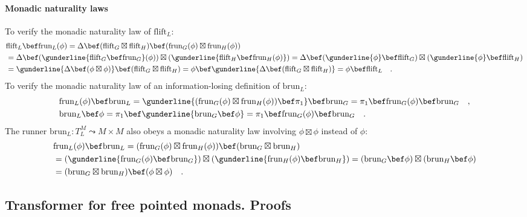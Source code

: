 \paragraph{Monadic naturality laws}

To verify the monadic naturality law of $\text{flift}_{L}$:
\begin{align*}
 & \text{flift}_{L}\bef\text{frun}_{L}(\phi)=\Delta\bef(\text{flift}_{G}\boxtimes\text{flift}_{H})\bef(\text{frun}_{G}(\phi)\boxtimes\text{frun}_{H}(\phi))\\
 & =\Delta\bef(\gunderline{\text{flift}_{G}\bef\text{frun}_{G}}(\phi))\boxtimes(\gunderline{\text{flift}_{H}\bef\text{frun}_{H}(\phi)})=\Delta\bef(\gunderline{\phi}\bef\text{flift}_{G})\boxtimes(\gunderline{\phi}\bef\text{flift}_{H})\\
 & =\gunderline{\Delta\bef(\phi\boxtimes\phi)}\bef(\text{flift}_{G}\boxtimes\text{flift}_{H})=\phi\bef\gunderline{\Delta\bef(\text{flift}_{G}\boxtimes\text{flift}_{H})}=\phi\bef\text{flift}_{L}\quad.
\end{align*}
To verify the monadic naturality law of an information-losing definition
of $\text{brun}_{L}$:
\begin{align*}
 & \text{frun}_{L}(\phi)\bef\text{brun}_{L}=\gunderline{(\text{frun}_{G}(\phi)\boxtimes\text{frun}_{H}(\phi))\bef\pi_{1}}\bef\text{brun}_{G}=\pi_{1}\bef\text{frun}_{G}(\phi)\bef\text{brun}_{G}\quad,\\
 & \text{brun}_{L}\bef\phi=\pi_{1}\bef\gunderline{\text{brun}_{G}\bef\phi}=\pi_{1}\bef\text{frun}_{G}(\phi)\bef\text{brun}_{G}\quad.
\end{align*}
The runner $\text{brun}_{L}:T_{L}^{M}\leadsto M\times M$ also obeys
a monadic naturality law involving $\phi\boxtimes\phi$ instead of
$\phi$:
\begin{align*}
 & \text{frun}_{L}(\phi)\bef\text{brun}_{L}=(\text{frun}_{G}(\phi)\boxtimes\text{frun}_{H}(\phi))\bef(\text{brun}_{G}\boxtimes\text{brun}_{H})\\
 & =(\gunderline{\text{frun}_{G}(\phi)\bef\text{brun}_{G}})\boxtimes(\gunderline{\text{frun}_{H}(\phi)\bef\text{brun}_{H}})=(\text{brun}_{G}\bef\phi)\boxtimes(\text{brun}_{H}\bef\phi)\\
 & =(\text{brun}_{G}\boxtimes\text{brun}_{H})\bef(\phi\boxtimes\phi)\quad.
\end{align*}


\subsection{Transformer for free pointed monads. Proofs}

